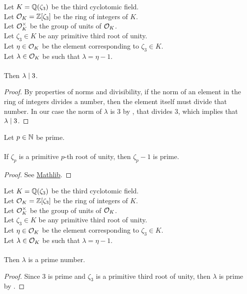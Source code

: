 \begin{lemma}
    \label{lmm:lambda_dvd_three}
    \leanok
    Let $K = \mathbb{Q}(\zeta_3)$ be the third cyclotomic field. \\
    Let $\mathcal{O}_K = \mathbb{Z}[\zeta_3]$ be the ring of integers of $K$. \\
    Let $\mathcal{O}^\times_K$ be the group of units of $\mathcal{O}_K$. \\
    Let $\zeta_3 \in K$ be any primitive third root of unity. \\
    Let $\eta \in \mathcal{O}_K$ be the element corresponding to $\zeta_3 \in K$. \\
    Let $\lambda \in \mathcal{O}_K$ be such that $\lambda = \eta -1$. \\\\
    Then $\lambda \mid 3$.
\end{lemma}
\begin{proof}
    \leanok
    By properties of norms and divisibility, if the norm of an element in the ring of integers
    divides a number, then the element itself must divide that number.
    In our case the norm of $\lambda$ is $3$ by , that divides $3$,
    which implies that $\lambda \mid 3$.
\end{proof}

\begin{theorem}
    \label{thm:zeta_sub_one_prime1}
    \leanok
    Let $p \in \mathbb{N}$ be prime. \\\\
    If $\zeta_p$ is a primitive $p$-th root of unity, then $\zeta_p - 1$ is prime.
\end{theorem}
\begin{proof}
    \leanok
    See \href{https://pitmonticone.github.io/FLT3/docs/FLT3/Mathlib/NumberTheory/Cyclotomic/Rat.html#IsPrimitiveRoot.zeta_sub_one_prime'}{Mathlib}.
\end{proof}

\begin{lemma}
    \label{lmm:lambda_prime}
    \leanok
    Let $K = \mathbb{Q}(\zeta_3)$ be the third cyclotomic field. \\
    Let $\mathcal{O}_K = \mathbb{Z}[\zeta_3]$ be the ring of integers of $K$. \\
    Let $\mathcal{O}^\times_K$ be the group of units of $\mathcal{O}_K$. \\
    Let $\zeta_3 \in K$ be any primitive third root of unity. \\
    Let $\eta \in \mathcal{O}_K$ be the element corresponding to $\zeta_3 \in K$. \\
    Let $\lambda \in \mathcal{O}_K$ be such that $\lambda = \eta -1$. \\\\
    Then $\lambda$ is a prime number.
\end{lemma}
\begin{proof}
    \leanok
    Since $3$ is prime and $\zeta_3$ is a primitive third root of unity, then $\lambda$ is prime
    by .
\end{proof}


